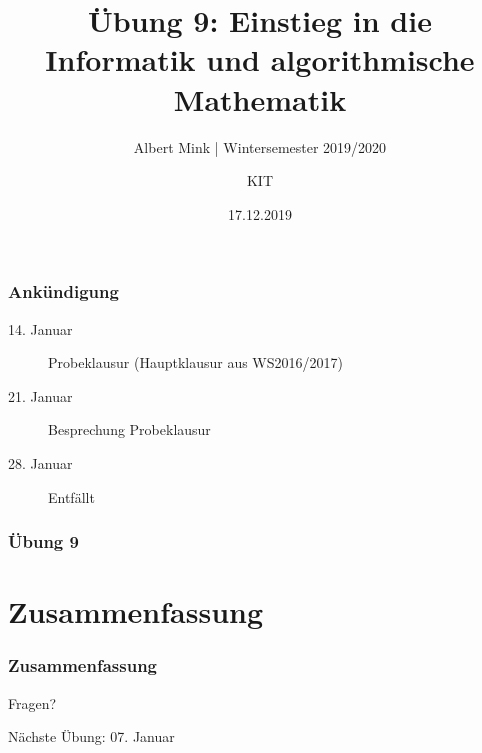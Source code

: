 \documentclass[c,18pt]{beamer}
\date{17.12.2019}
\title{Übung 9: Einstieg in die Informatik und algorithmische Mathematik}
\subtitle{Albert Mink | Wintersemester 2019/2020}
\author[Albert Mink, ]{KIT}
\institute[Institut für Angewandte und Numerische Mathematik (IANM)]{Institut für Angewandte und Numerische Mathematik}
\begin{document}
\begin{frame}
  \maketitle
\end{frame}

\begin{frame}
  \frametitle{Ankündigung}%
  
  \begin{description}
      \item[14. Januar] Probeklausur (Hauptklausur aus WS2016/2017)
      \item[21. Januar] Besprechung Probeklausur
      \item[28. Januar] Entfällt
  \end{description}
  \hfill
  
\end{frame}

\begin{frame}
  \frametitle{Übung 9}%
\tableofcontents[hideallsubsections]
\end{frame}


\setcounter{exercise}{27}
\setcounter{exercise}{28}

\section{Zusammenfassung}
\begin{frame}
  \frametitle{Zusammenfassung}%
\tableofcontents[hideallsubsections]
\end{frame}

\begin{frame}
\centering
\Huge\textcolor{KITgreen}{Fragen?}
\vspace{2cm}

{\LARGE
N\"achste \"Ubung: 07. Januar
}
\end{frame}


\end{document}
